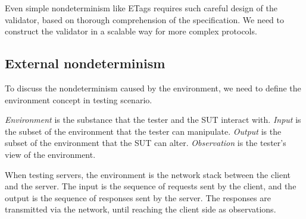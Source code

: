 Even simple nondeterminism like ETags requires such careful design of the
validator, based on thorough comprehension of the specification.  We need to
construct the validator in a scalable way for more complex protocols.

\subsection{External nondeterminism}
\label{sec:intro-external-nondet}
To discuss the nondeterminism caused by the environment, we need to define the
environment concept in testing scenario.
\begin{definition}
\label{def:environment}
  {\em Environment} is the substance that the tester and the SUT interact with.
  {\em Input} is the subset of the environment that the tester can manipulate.
  {\em Output} is the subset of the environment that the SUT can alter.  {\em
    Observation} is the tester's view of the environment.
\end{definition}
When testing servers, the environment is the network stack between the client
and the server.  The input is the sequence of requests sent by the client, and
the output is the sequence of responses sent by the server.  The responses are
transmitted via the network, until reaching the client side as observations.

